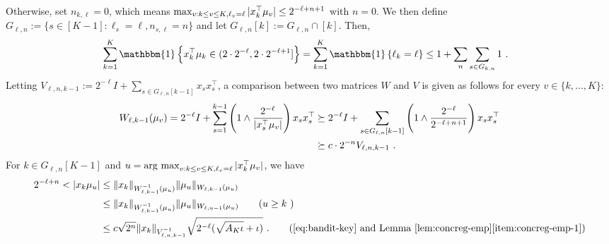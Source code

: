 \documentclass{article}
\def\one{\mathbbm{1}}
\newcommand{\blue}[1]{{\color[rgb]{.3,.5,1}#1}}
\newcommand{\kj}[1]{{\color{Magenta}[KJ: #1]}}
\renewcommand{\blue}[1]{#1}
\begin{document}
Otherwise, set $n_{k,\ell}=0$, which means $\max_{v:k\le v\le K, \ell_v = \ell}|x_k^{\top} \mu_v|  \le 2^{-\ell+n+1}$ with $n=0$.
We then define $\blue{G_{\ell,n}} := \{s\in[K-1]:\ell_s=\ell,n_{s,\ell}=n\}$ and let $\blue{G_{\ell,n}[k]} := G_{\ell,n} \cap [k]$.
Then,
\begin{align*}
  &\sum_{k=1}^{K}\one\cbr{x_k^\T\mu_k \in \lparen 2\cd2^{-\ell},2\cd2^{-\ell+1} \rbrack}=\sum_{k=1}^{K}\one\cbr{\ell_k=\ell}
  \le 1 + \sum_n \sum_{s\in G_{k,n}} 1~.
\end{align*}
Letting $\blue{V_{\ell,n,k-1}}  := 2^{-\ell} I + \sum_{s\in G_{\ell,n}[k-1]} x_s x_s^\top$,
a comparison between two matrices $W$ and $V$ is given as follows for every $v\in \{k,\ldots,K\}$:
\begin{align}\label{eq:bandit-key}
  W_{\ell,k-1}(\mu_v)
  =2^{-\ell} I + \sum_{s=1}^{k-1} \del{1\wedge \fr{2^{-\ell}}{|x_s^\T\mu_v|}} x_s x_s^\top \notag
  &\succeq 2^{-\ell} I + \sum_{s\in G_{\ell,n}[k-1]} \del{1\wedge \fr{2^{-\ell}}{2^{-\ell+n+1}}} x_s x_s^\top \notag
  \\& \succeq c\cd 2^{-n} V_{\ell,n,k-1}~.
\end{align}
For $k\in G_{\ell,n}[K-1]$ and $u=\operatorname*{arg~max}_{v:k\le v\le K, \ell_v = \ell} |x_k^{\top} \mu_v|$, we have 
\begin{align*}
  2^{-\ell+n}
  <|x_k\mu_u|
  &\le \|x_k\|_{W_{\ell,k-1}^{-1}(\mu_u)} \|\mu_u\|_{W_{\ell,k-1}(\mu_u)}
  \\&\le \|x_k\|_{W_{\ell,k-1}^{-1}(\mu_u)} \|\mu_u\|_{W_{\ell,u-1}(\mu_u)} \tag{$u \ge k$ }
  \\&\le c\sqrt{2^n} \|x_k\|_{V_{\ell,n,k-1}^{-1}} \sqrt{2^{-\ell}(\sqrt{A_K\iota}+\iota)}~.
       \tag{\eqref{eq:bandit-key} and Lemma~\ref{lem:concreg-emp}\ref{item:concreg-emp-1}}
\end{align*}
\end{document}
